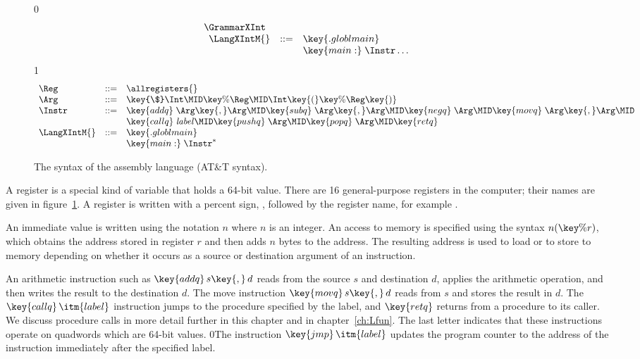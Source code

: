 \documentclass[7x10]{TimesAPriori_MIT}%
\def\racketEd{0}
\def\pythonEd{1}
\def\edition{0}
\newcommand{\racket}[1]{{\if\edition\racketEd{#1}\fi}}
\numberwithin{theorem}{chapter}
\numberwithin{definition}{chapter}
\numberwithin{equation}{chapter}
\begin{document}
\begin{figure}[tp]
\begin{tcolorbox}[colback=white]
{\if\edition\racketEd    
\[
\begin{array}{l}
  \GrammarXInt \\
\begin{array}{lcl}
\LangXIntM{} &::= & \key{.globl main}\\
      &    & \key{main:} \; \Instr\ldots
\end{array}
\end{array}
\]
\fi}
{\if\edition\pythonEd
\[
\begin{array}{lcl}
\Reg &::=& \allregisters{} \\
\Arg &::=&  \key{\$}\Int \MID \key{\%}\Reg \MID \Int\key{(}\key{\%}\Reg\key{)}\\
\Instr &::=& \key{addq} \; \Arg\key{,} \Arg \MID
      \key{subq} \; \Arg\key{,} \Arg \MID
      \key{negq} \; \Arg \MID \key{movq} \; \Arg\key{,} \Arg \MID \\
  &&  \key{callq} \; \mathit{label} \MID
      \key{pushq}\;\Arg \MID \key{popq}\;\Arg \MID \key{retq} \\
\LangXIntM{} &::= & \key{.globl main}\\
      &    & \key{main:} \; \Instr^{*}
\end{array}
\]
\fi}
\end{tcolorbox}
\caption{The syntax of the \LangXInt{} assembly language (AT\&T syntax).}
\label{fig:x86-int-concrete}
\end{figure}

A register is a special kind of variable that holds a 64-bit
value. There are 16 general-purpose registers in the computer; their
names are given in figure~\ref{fig:x86-int-concrete}.  A register is
written with a percent sign, \key{\%}, followed by the register name,
for example .

An immediate value is written using the notation \key{\$}$n$ where $n$
is an integer.
%
%
An access to memory is specified using the syntax $n(\key{\%}r)$,
which obtains the address stored in register $r$ and then adds $n$
bytes to the address. The resulting address is used to load or to store
to memory depending on whether it occurs as a source or destination
argument of an instruction.

An arithmetic instruction such as $\key{addq}\,s\key{,}\,d$ reads from
the source $s$ and destination $d$, applies the arithmetic operation,
and then writes the result to the destination $d$. 
%
The move instruction $\key{movq}\,s\key{,}\,d$ reads from $s$ and
stores the result in $d$.
%
The $\key{callq}\,\itm{label}$ instruction jumps to the procedure
specified by the label, and $\key{retq}$ returns from a procedure to
its caller. 
%
We discuss procedure calls in more detail further in this chapter and
in chapter~\ref{ch:Lfun}.
%
The last letter  indicates that these instructions operate on
quadwords which are 64-bit values.
%
\racket{The instruction $\key{jmp}\,\itm{label}$ updates the program
  counter to the address of the instruction immediately after the
  specified label.}
\end{document}
